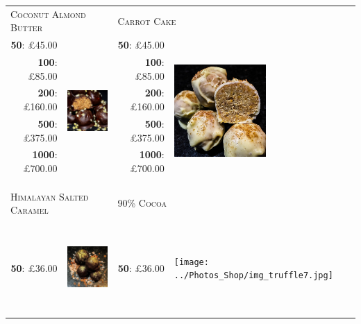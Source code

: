 \documentclass[11pt, english]{article}
\begin{document}
	\begin{table}[h]
	\begin{center}
	\begin{tabular}{r|p{4cm}r|p{4cm}}
		\multicolumn{2}{l}{\textsc{Coconut Almond Butter}} & \multicolumn{2}{l}{\textsc{Carrot Cake}}\\
		\textbf{50}: \pounds45.00 & \multirow{8}{*}{\includegraphics[width=3.5cm,height=3.5cm]{../Photos_Shop/img_truffle1.jpg}} & \textbf{50}: \pounds45.00 & \multirow{8}{*}{\includegraphics[width=3.5cm,height=3.5cm]{../Photos_Shop/img_truffle5.jpg}}\\
		\textbf{100}: \pounds85.00 & & \textbf{100}: \pounds85.00 & \\
		\textbf{200}: \pounds160.00 & & \textbf{200}: \pounds160.00 & \\
		\textbf{500}: \pounds375.00 & & \textbf{500}: \pounds375.00 & \\
		\textbf{1000}: \pounds700.00 & & \textbf{1000}: \pounds700.00 & \\
		\multicolumn{4}{l}{}\\
		\multicolumn{4}{l}{}\\
		\multicolumn{4}{l}{}\\
		\multicolumn{2}{l}{\textsc{Himalayan Salted Caramel}} & \multicolumn{2}{l}{\textsc{90\% Cocoa}}\\
		\textbf{50}: \pounds36.00 & \multirow{5}{*}{\includegraphics[width=3.5cm,height=3.5cm]{../Photos_Shop/img_truffle6.jpg}} & \textbf{50}: \pounds36.00 & \multirow{5}{*}{\texttt{[image: ../Photos\_Shop/img\_truffle7.jpg]}}\\

\end{tabular}
\end{center}
\end{table}
\end{document}
